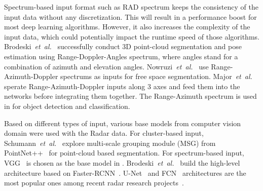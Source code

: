 \documentclass[10pt, conference, compsocconf]{IEEEtran}
\newcommand{\etal}{\textit{et~al.}}
\begin{document}
Spectrum-based input format such as RAD spectrum
keeps the consistency of the input data without any discretization. This will result in a performance boost for most deep learning algorithms. However, it also increases the complexity of the input data, which could potentially impact the runtime speed of those algorithms. Brodeski~\etal~\cite{Ref:DeepRadarDetector} successfully conduct 3D point-cloud segmentation and pose estimation using Range-Doppler-Angles spectrum, where angles stand for a combination of azimuth and elevation angles. Nowruzi~\etal~\cite{Ref:DeepOpenSpace} use Range-Azimuth-Doppler spectrums as inputs for free space segmentation. Major~\etal~\cite{Ref:RADVehicle} sperate Range-Azimuth-Doppler inputs along $3$ axes and feed them into the networks before integrating them together. %
The Range-Azimuth spectrum is used in \cite{Ref:RadarCamFusion, Ref:ClassificationRadarSpectra, Ref:ProbabilisticOriented} for object detection and classification. 

Based on different types of input, various base models from computer vision domain were used with the Radar data. For cluster-based input,
Schumann~\etal~\cite{Ref:ClusterSegmentation} explore multi-scale grouping module (MSG) from PointNet++~\cite{Ref:PointNet++} for point-cloud based segmentation. For spectrum-based input, VGG~\cite{BG:VGG} is chosen as the base model in \cite{Ref:ClassificationRadarSpectra}. Brodeski~\etal~\cite{Ref:DeepRadarDetector} build the high-level architecture based on Faster-RCNN~\cite{Ref:FasterRCNN}. U-Net~\cite{Ref:U-Net} and FCN~\cite{Ref:FCN} architectures are the most popular ones among recent radar research projects~\cite{Ref:ProbabilisticOriented, Ref:RadarGhostObject, Ref:DeepOpenSpace}.
\end{document}
